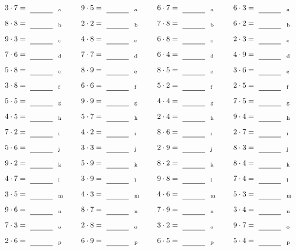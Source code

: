 \documentclass
[
  draft    = true,
  fontsize = 11pt,
  parskip  = half-
]
{scrartcl}
\begin{document}
\par\vfill\par
\begin{align*}
    \pline{3\cdot7}&=\rline{a}
  & \pline{9\cdot5}&=\rline{a}
  & \pline{6\cdot7}&=\rline{a}
  & \pline{6\cdot3}&=\rline{a} \\[1ex]
    \pline{8\cdot8}&=\rline{b}
  & \pline{2\cdot2}&=\rline{b}
  & \pline{7\cdot8}&=\rline{b}
  & \pline{6\cdot2}&=\rline{b} \\[1ex]
    \pline{9\cdot3}&=\rline{c}
  & \pline{4\cdot8}&=\rline{c}
  & \pline{6\cdot8}&=\rline{c}
  & \pline{2\cdot3}&=\rline{c} \\[1ex]
    \pline{7\cdot6}&=\rline{d}
  & \pline{7\cdot7}&=\rline{d}
  & \pline{6\cdot4}&=\rline{d}
  & \pline{4\cdot9}&=\rline{d} \\[1ex]
    \pline{5\cdot8}&=\rline{e}
  & \pline{8\cdot9}&=\rline{e}
  & \pline{8\cdot5}&=\rline{e}
  & \pline{3\cdot6}&=\rline{e} \\[1ex]
    \pline{3\cdot8}&=\rline{f}
  & \pline{6\cdot6}&=\rline{f}
  & \pline{5\cdot2}&=\rline{f}
  & \pline{2\cdot5}&=\rline{f} \\[1ex]
    \pline{5\cdot5}&=\rline{g}
  & \pline{9\cdot9}&=\rline{g}
  & \pline{4\cdot4}&=\rline{g}
  & \pline{7\cdot5}&=\rline{g} \\[1ex]
    \pline{4\cdot5}&=\rline{h}
  & \pline{5\cdot7}&=\rline{h}
  & \pline{2\cdot4}&=\rline{h}
  & \pline{9\cdot4}&=\rline{h} \\[1ex]
    \pline{7\cdot2}&=\rline{i}
  & \pline{4\cdot2}&=\rline{i}
  & \pline{8\cdot6}&=\rline{i}
  & \pline{2\cdot7}&=\rline{i} \\[1ex]
    \pline{5\cdot6}&=\rline{j}
  & \pline{3\cdot3}&=\rline{j}
  & \pline{2\cdot9}&=\rline{j}
  & \pline{8\cdot3}&=\rline{j} \\[1ex]
    \pline{9\cdot2}&=\rline{k}
  & \pline{5\cdot9}&=\rline{k}
  & \pline{8\cdot2}&=\rline{k}
  & \pline{8\cdot4}&=\rline{k} \\[1ex]
    \pline{4\cdot7}&=\rline{l}
  & \pline{3\cdot9}&=\rline{l}
  & \pline{9\cdot8}&=\rline{l}
  & \pline{7\cdot4}&=\rline{l} \\[1ex]
    \pline{3\cdot5}&=\rline{m}
  & \pline{4\cdot3}&=\rline{m}
  & \pline{4\cdot6}&=\rline{m}
  & \pline{5\cdot3}&=\rline{m} \\[1ex]
    \pline{9\cdot6}&=\rline{n}
  & \pline{8\cdot7}&=\rline{n}
  & \pline{7\cdot9}&=\rline{n}
  & \pline{3\cdot4}&=\rline{n} \\[1ex]
    \pline{7\cdot3}&=\rline{o}
  & \pline{2\cdot8}&=\rline{o}
  & \pline{3\cdot2}&=\rline{o}
  & \pline{9\cdot7}&=\rline{o} \\[1ex]
    \pline{2\cdot6}&=\rline{p}
  & \pline{6\cdot9}&=\rline{p}
  & \pline{6\cdot5}&=\rline{p}
  & \pline{5\cdot4}&=\rline{p}
\end{align*}
\end{document}
